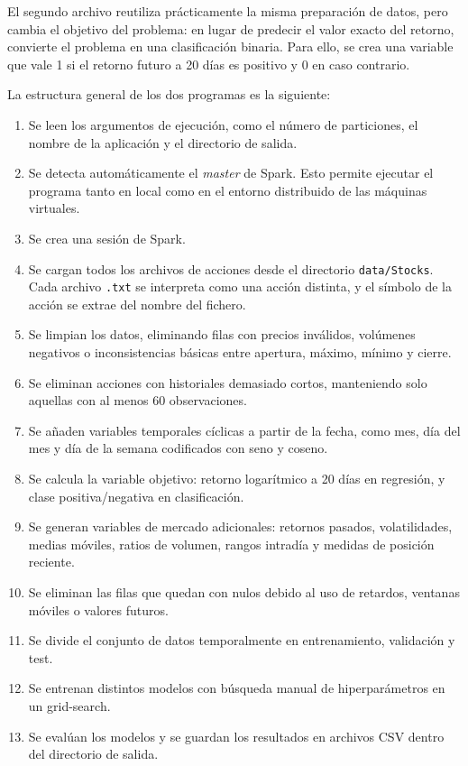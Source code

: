 \documentclass[runningheads]{llncs}
\begin{document}
El segundo archivo reutiliza prácticamente la misma preparación de datos, pero cambia el objetivo del problema: en lugar de predecir el valor exacto del retorno, convierte el problema en una clasificación binaria. Para ello, se crea una variable que vale 1 si el retorno futuro a 20 días es positivo y 0 en caso contrario.

La estructura general de los dos programas es la siguiente:

\begin{enumerate}
    \item Se leen los argumentos de ejecución, como el número de particiones, el nombre de la aplicación y el directorio de salida.
    \item Se detecta automáticamente el \textit{master} de Spark. Esto permite ejecutar el programa tanto en local como en el entorno distribuido de las máquinas virtuales.
    \item Se crea una sesión de Spark.
    \item Se cargan todos los archivos de acciones desde el directorio \texttt{data/Stocks}. Cada archivo \texttt{.txt} se interpreta como una acción distinta, y el símbolo de la acción se extrae del nombre del fichero.
    \item Se limpian los datos, eliminando filas con precios inválidos, volúmenes negativos o inconsistencias básicas entre apertura, máximo, mínimo y cierre.
    \item Se eliminan acciones con historiales demasiado cortos, manteniendo solo aquellas con al menos 60 observaciones.
    \item Se añaden variables temporales cíclicas a partir de la fecha, como mes, día del mes y día de la semana codificados con seno y coseno.
    \item Se calcula la variable objetivo: retorno logarítmico a 20 días en regresión, y clase positiva/negativa en clasificación.
    \item Se generan variables de mercado adicionales: retornos pasados, volatilidades, medias móviles, ratios de volumen, rangos intradía y medidas de posición reciente.
    \item Se eliminan las filas que quedan con nulos debido al uso de retardos, ventanas móviles o valores futuros.
    \item Se divide el conjunto de datos temporalmente en entrenamiento, validación y test.
    \item Se entrenan distintos modelos con búsqueda manual de hiperparámetros en un grid-search.
    \item Se evalúan los modelos y se guardan los resultados en archivos CSV dentro del directorio de salida.
\end{enumerate}
\end{document}
